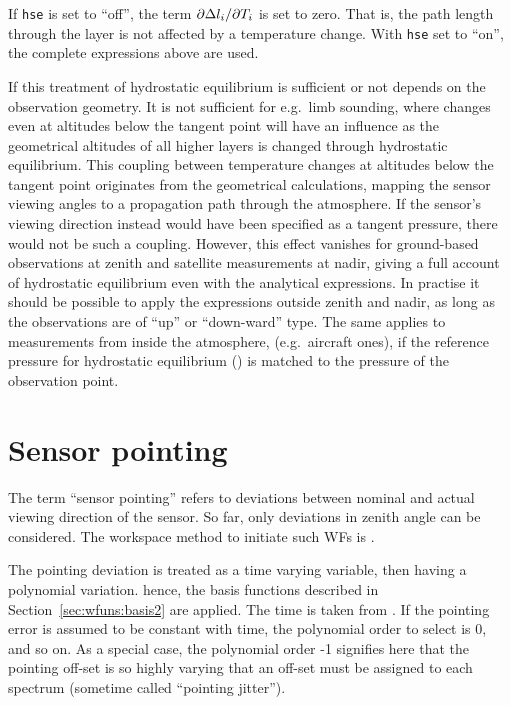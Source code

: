 If \verb|hse| is set to ``off'', the term $\partial \Delta l_{i}/\partial
T_{i}$ is set to zero. That is, the path length through the layer is not
affected by a temperature change. With \verb|hse| set to ``on'', the complete
expressions above are used.

If this treatment of hydrostatic equilibrium is sufficient or not depends on
the observation geometry. It is not sufficient for e.g.\ limb sounding, where
changes even at altitudes below the tangent point will have an influence as the
geometrical altitudes of all higher layers is changed through hydrostatic
equilibrium. This coupling between temperature changes at altitudes below the
tangent point originates from the geometrical calculations, mapping the sensor
viewing angles to a propagation path through the atmosphere. If the sensor's
viewing direction instead would have been specified as a tangent pressure, there
would not be such a coupling. However, this effect vanishes for ground-based
observations at zenith and satellite measurements at nadir, giving a full
account of hydrostatic equilibrium even with the analytical expressions. In
practise it should be possible to apply the expressions outside zenith and
nadir, as long as the observations are of ``up'' or ``down-ward'' type. The
same applies to measurements from inside the atmosphere, (e.g.\ aircraft ones),
if the reference pressure for hydrostatic equilibrium ()
is matched to the pressure of the observation point.





\section{Sensor pointing}
\label{sec:wfuns:sensorpointing}

The term ``sensor pointing'' refers to deviations between nominal and
actual viewing direction of the sensor. So far, only deviations in zenith angle
can be considered. The workspace method to initiate such WFs is
.

The pointing deviation is treated as a time varying variable, then having a
polynomial variation. hence, the basis functions described in
Section~\ref{sec:wfuns:basis2} are applied. The time is taken from
. If the pointing error is assumed to be constant with
time, the polynomial order to select is 0, and so on. As a special case, the
polynomial order -1 signifies here that the pointing off-set is so highly
varying that an off-set must be assigned to each spectrum
(sometime called ``pointing jitter'').

